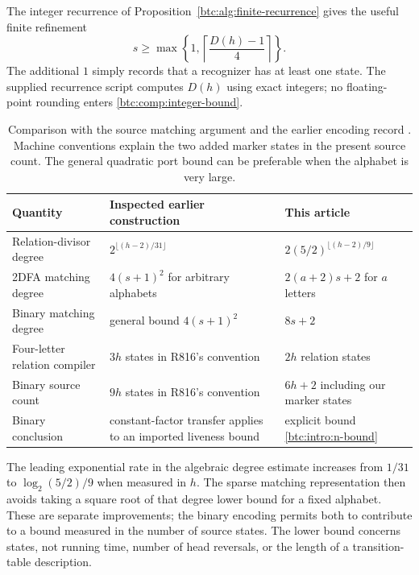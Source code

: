 The integer recurrence of Proposition~\ref{btc:alg:finite-recurrence}
gives the useful finite refinement
\begin{equation}\label{btc:comp:integer-bound}
 s\ge
 \max\left\{1,\left\lceil\frac{D(h)-1}{4}\right\rceil\right\}.
\end{equation}
The additional $1$ simply records that a recognizer has at least
one state. The supplied recurrence script computes $D(h)$
using exact integers; no floating-point rounding enters
\eqref{btc:comp:integer-bound}.

\begin{table}[tb]
\centering
\small
\begin{tabular}{p{}p{}p{}}
\toprule
Quantity & Inspected earlier construction & This article\\
\midrule
Relation-divisor degree
& $2^{\lfloor(h-2)/31\rfloor}$
& $2(5/2)^{\lfloor(h-2)/9\rfloor}$\\[3pt]
2DFA matching degree
& $4(s+1)^2$ for arbitrary alphabets
& $2(a+2)s+2$ for $a$ letters\\[3pt]
Binary matching degree
& general bound $4(s+1)^2$
& $8s+2$\\[3pt]
Four-letter relation compiler
& $3h$ states in R816's convention
& $2h$ relation states\\[3pt]
Binary source count
& $9h$ states in R816's convention
& $6h+2$ including our marker states\\[3pt]
Binary conclusion
& constant-factor transfer applies to an imported liveness bound
& explicit bound \eqref{btc:intro:n-bound}\\
\bottomrule
\end{tabular}
\caption{Comparison with the source matching argument
\cite{OpenAILiveness2026} and the earlier encoding record
\cite{TheoremDBR816}. Machine conventions explain the two added
marker states in the present source count. The general quadratic
port bound can be preferable when the alphabet is very large.}
\label{btc:comp:comparison}
\end{table}

The leading exponential rate in the algebraic degree estimate
increases from $1/31$ to $\log_2(5/2)/9$ when measured in $h$.
The sparse matching representation then avoids taking a square
root of that degree lower bound for a fixed alphabet. These
are separate improvements; the binary encoding permits both
to contribute to a bound measured in the number of source
states. The lower bound concerns states, not running time,
number of head reversals, or the length of a transition-table
description.

